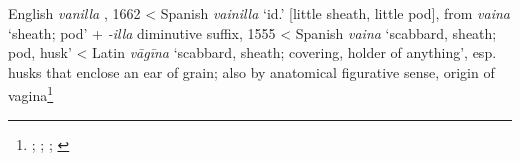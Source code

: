 \begin{etymology}\label{ety:vanilla}
English \textit{vanilla }, 1662
< Spanish \textit{vainilla} `id.' [little sheath, little pod], from \textit{vaina} `sheath; pod' + \textit{-illa} diminutive suffix, 1555
< Spanish \textit{vaina} `scabbard, sheath; pod, husk'
< Latin \textit{vāgīna} `scabbard, sheath; covering, holder of anything', esp. husks that enclose an ear of grain; also by anatomical figurative sense, origin of vagina\footnote{\textcite[s.v. vanilla]{oed}; \textcite[538]{gomez_de_silva_elseviers_1985}; \textcite[596]{corominas_breve_1987}; \textcite[s.v. vāgīna]{lewis_latin_1879}}
\end{etymology}